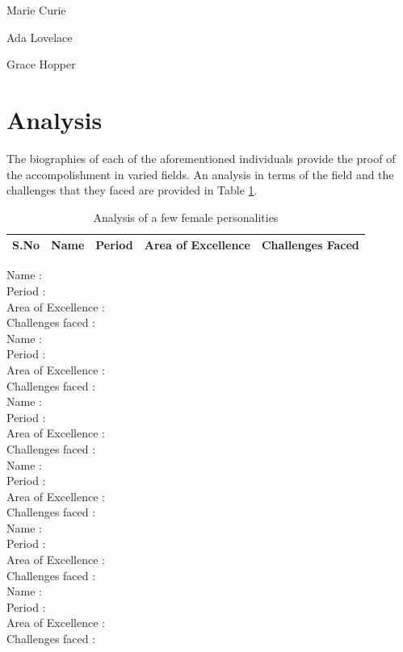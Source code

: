 \documentclass[a4paper,10pt]{article}
\begin{document}
Marie Curie

Ada Lovelace

Grace Hopper

\section{Analysis}
The biographies of each of the aforementioned individuals provide the proof of the accompolishment in varied fields. An analysis in terms of the field and the challenges that they faced are provided in Table \ref{tab:analysis}.
\begin{table}
\label{tab:analysis}
\caption{Analysis of a few female personalities}
\centering
 \begin{tabular}{|l|l|l|l|l|}
  \hline
  S.No & Name & Period & Area of Excellence & Challenges Faced \\
  \hline
 
 \end{tabular}

\end{table}


\newblock
Name : \\
Period : \\
Area of Excellence : \\
Challenges faced : \\

\newblock
Name : \\
Period : \\
Area of Excellence : \\
Challenges faced : \\

\newblock
Name : \\
Period : \\
Area of Excellence : \\
Challenges faced : \\

\newblock
Name : \\
Period : \\
Area of Excellence : \\
Challenges faced : \\

\newblock
Name : \\
Period : \\
Area of Excellence : \\
Challenges faced : \\

\newblock
Name : \\
Period : \\
Area of Excellence : \\
Challenges faced : \\
\end{document}
